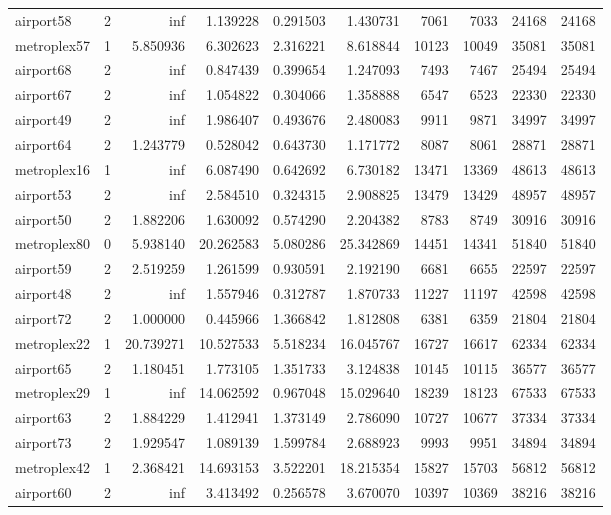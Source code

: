 \begin{longtable}{|l|r|r|r|r|r|r|r|r|r|}
airport58 & 2 & inf & 1.139228 & 0.291503 & 1.430731 & 7061 & 7033 & 24168 & 24168 \\
metroplex57 & 1 & 5.850936 & 6.302623 & 2.316221 & 8.618844 & 10123 & 10049 & 35081 & 35081 \\
airport68 & 2 & inf & 0.847439 & 0.399654 & 1.247093 & 7493 & 7467 & 25494 & 25494 \\
airport67 & 2 & inf & 1.054822 & 0.304066 & 1.358888 & 6547 & 6523 & 22330 & 22330 \\
airport49 & 2 & inf & 1.986407 & 0.493676 & 2.480083 & 9911 & 9871 & 34997 & 34997 \\
airport64 & 2 & 1.243779 & 0.528042 & 0.643730 & 1.171772 & 8087 & 8061 & 28871 & 28871 \\
metroplex16 & 1 & inf & 6.087490 & 0.642692 & 6.730182 & 13471 & 13369 & 48613 & 48613 \\
airport53 & 2 & inf & 2.584510 & 0.324315 & 2.908825 & 13479 & 13429 & 48957 & 48957 \\
airport50 & 2 & 1.882206 & 1.630092 & 0.574290 & 2.204382 & 8783 & 8749 & 30916 & 30916 \\
metroplex80 & 0 & 5.938140 & 20.262583 & 5.080286 & 25.342869 & 14451 & 14341 & 51840 & 51840 \\
airport59 & 2 & 2.519259 & 1.261599 & 0.930591 & 2.192190 & 6681 & 6655 & 22597 & 22597 \\
airport48 & 2 & inf & 1.557946 & 0.312787 & 1.870733 & 11227 & 11197 & 42598 & 42598 \\
airport72 & 2 & 1.000000 & 0.445966 & 1.366842 & 1.812808 & 6381 & 6359 & 21804 & 21804 \\
metroplex22 & 1 & 20.739271 & 10.527533 & 5.518234 & 16.045767 & 16727 & 16617 & 62334 & 62334 \\
airport65 & 2 & 1.180451 & 1.773105 & 1.351733 & 3.124838 & 10145 & 10115 & 36577 & 36577 \\
metroplex29 & 1 & inf & 14.062592 & 0.967048 & 15.029640 & 18239 & 18123 & 67533 & 67533 \\
airport63 & 2 & 1.884229 & 1.412941 & 1.373149 & 2.786090 & 10727 & 10677 & 37334 & 37334 \\
airport73 & 2 & 1.929547 & 1.089139 & 1.599784 & 2.688923 & 9993 & 9951 & 34894 & 34894 \\
metroplex42 & 1 & 2.368421 & 14.693153 & 3.522201 & 18.215354 & 15827 & 15703 & 56812 & 56812 \\
airport60 & 2 & inf & 3.413492 & 0.256578 & 3.670070 & 10397 & 10369 & 38216 & 38216 \\

\end{longtable}

